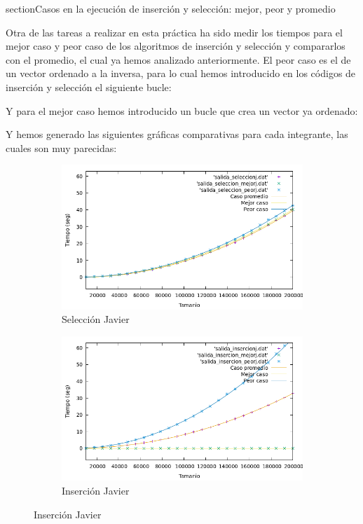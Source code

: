 \documentclass[10pt,a4paper]{article}
\begin{document}
section{Casos en la ejecución de inserción y selección: mejor, peor y promedio}

Otra de las tareas a realizar en esta práctica ha sido medir los tiempos para el mejor caso y peor caso de los algoritmos de inserción y selección y compararlos con el promedio, el cual ya hemos analizado anteriormente. El peor caso es el de un vector ordenado a la inversa, para lo cual hemos introducido en los códigos de inserción y selección el siguiente bucle:



Y para el mejor caso hemos introducido un bucle que crea un vector ya ordenado:



Y hemos generado las siguientes gráficas comparativas para cada integrante, las cuales son muy parecidas:

\begin{figure}[h!]
	\begin{subfigure}{.5\textwidth}
		\centering
		\includegraphics[scale=0.3]{../../Images/Gráfica casos selección Javi5454.png}
		\caption{Selección Javier}
	\end{subfigure}
	\hfill
	\begin{subfigure}{.5\textwidth}
		\centering
		\includegraphics[scale=0.3]{../../Images/Gráfica inserción casos Javi5454.png}
		\caption{Inserción Javier}
	\end{subfigure}
\end{figure}
\end{document}
